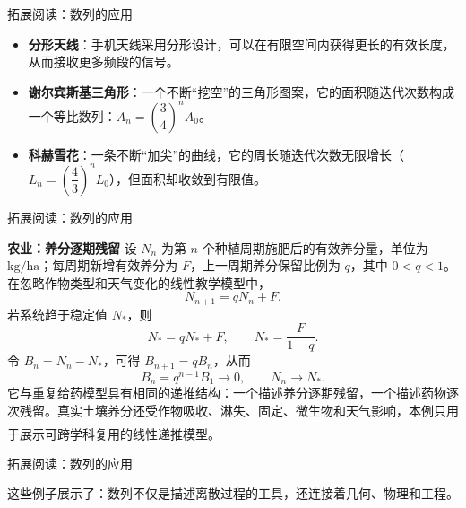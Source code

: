 \documentclass[aspectratio=169,10pt,fontset=fandol]{ctexbeamer}
\newcommand{\upcite}[1]{\textsuperscript{\textsuperscript{\cite{#1}}}}
\begin{document}
\begin{frame}[t,fragile]{拓展阅读：数列的应用}
\normalsize
{\normalsize
\begin{itemize}
\item \textbf{分形天线}：手机天线采用分形设计，可以在有限空间内获得更长的有效长度，从而接收更多频段的信号。
\item \textbf{谢尔宾斯基三角形}：一个不断“挖空”的三角形图案，它的面积随迭代次数构成一个等比数列：\(A_n = \left(\dfrac{3}{4}\right)^n A_0\)。
\item \textbf{科赫雪花}：一条不断“加尖”的曲线，它的周长随迭代次数无限增长（\(L_n = \left(\dfrac{4}{3}\right)^n L_0\)），但面积却收敛到有限值。
\end{itemize}
}
\end{frame}
\begin{frame}[t,fragile]{拓展阅读：数列的应用}
\footnotesize
{\footnotesize

\textbf{农业：养分逐期残留}
设 $N_n$ 为第 $n$ 个种植周期施肥后的有效养分量，单位为 $\mathrm{kg/ha}$；每周期新增有效养分为 $F$，上一周期养分保留比例为 $q$，其中 $0<q<1$。在忽略作物类型和天气变化的线性教学模型中，
\[
N_{n+1}=qN_n+F.
\]
若系统趋于稳定值 $N_*$，则
\[
N_*=qN_*+F,\qquad N_*=\frac{F}{1-q}.
\]
令 $B_n=N_n-N_*$，可得 $B_{n+1}=qB_n$，从而
\[
B_n=q^{n-1}B_1\to0,\qquad N_n\to N_*.
\]
它与重复给药模型具有相同的递推结构：一个描述养分逐期残留，一个描述药物逐次残留。真实土壤养分还受作物吸收、淋失、固定、微生物和天气影响，本例只用于展示可跨学科复用的线性递推模型。\upcite{BradyWeil}


}
\end{frame}
\begin{frame}[t,fragile]{拓展阅读：数列的应用}
\normalsize
{\normalsize
这些例子展示了：数列不仅是描述离散过程的工具，还连接着几何、物理和工程。

}
\end{frame}
\end{document}
